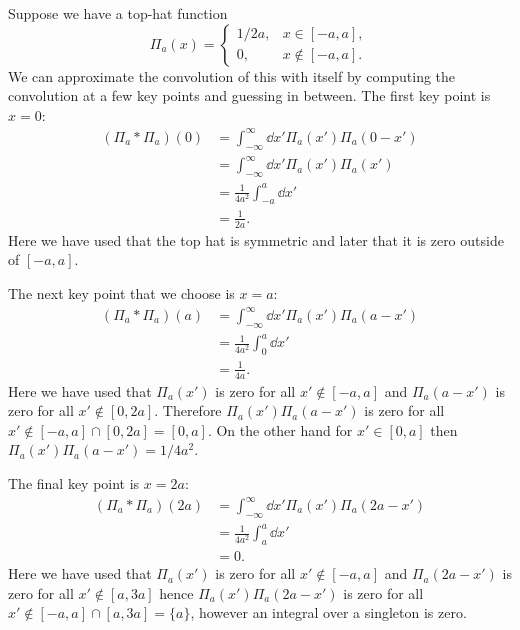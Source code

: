 \documentclass[a4paper]{article}
\newcommand{\convolution}{\mathbin{*}}
\newcommand{\intersection}{\cap}
\begin{document}
    \begin{example}
        Suppose we have a top-hat function
        \[
            \Pi_a(x) =
            \begin{cases}
                1/2a, & x \in [-a, a],\\
                0, & x\notin[-a, a].
            \end{cases}
        \]
        We can approximate the convolution of this with itself by computing the convolution at a few key points and guessing in between.
        The first key point is \(x = 0\):
        \begin{align*}
            (\Pi_a\convolution \Pi_a)(0) &= \int_{-\infty}^{\infty} \dd{x'} \Pi_a(x')\Pi_a(0 - x')\\
            &= \int_{-\infty}^{\infty} \dd{x'} \Pi_a(x')\Pi_a(x')\\
            &= \frac{1}{4a^2}\int_{-a}^{a} \dd{x'}\\
            &= \frac{1}{2a}.
        \end{align*}
        Here we have used that the top hat is symmetric and later that it is zero outside of \([-a, a]\).
        
        The next key point that we choose is \(x = a\):
        \begin{align*}
            (\Pi_a\convolution \Pi_a)(a) &= \int_{-\infty}^{\infty} \dd{x'} \Pi_a(x')\Pi_a(a - x')\\
            &= \frac{1}{4a^2}\int_{0}^{a}\dd{x'}\\
            &= \frac{1}{4a}.
        \end{align*}
        Here we have used that \(\Pi_a(x')\) is zero for all \(x'\notin[-a, a]\) and \(\Pi_a(a - x')\) is zero for all \(x'\notin[0, 2a]\).
        Therefore \(\Pi_a(x')\Pi_a(a - x')\) is zero for all \(x'\notin[-a, a]\intersection[0, 2a] = [0, a]\).
        On the other hand for \(x'\in[0, a]\) then \(\Pi_a(x')\Pi_a(a - x') = 1/4a^2\).
        
        The final key point is \(x = 2a\):
        \begin{align*}
            (\Pi_a\convolution \Pi_a)(2a) &= \int_{-\infty}^{\infty} \dd{x'} \Pi_a(x')\Pi_a(2a - x')\\
            &= \frac{1}{4a^2}\int_{a}^{a}\dd{x'}\\
            &= 0.
        \end{align*}
        Here we have used that \(\Pi_a(x')\) is zero for all \(x'\notin[-a, a]\) and \(\Pi_a(2a - x')\) is zero for all \(x'\notin[a, 3a]\) hence \(\Pi_a(x')\Pi_a(2a - x')\) is zero for all \(x'\notin[-a, a]\intersection[a, 3a] = \{a\}\), however an integral over a singleton is zero.
        

\end{example}
\end{document}
